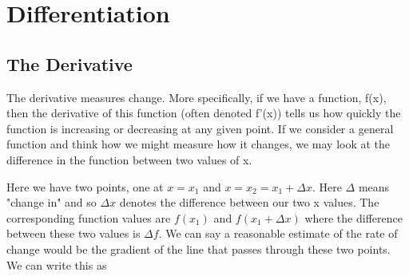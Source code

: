 \chapter{Differentiation}
\section{The Derivative}

The derivative measures change. More specifically, if we have a function, f(x), then the derivative
of this function (often denoted f'(x)) tells us how quickly the function is increasing or decreasing
at any given point. If we consider a general function and think how we might measure how it changes,
we may look at the difference in the function between two values of x.

\begin{center}
\end{center}

Here we have two points, one at $x = x_1$ and $x = x_2 = x_1 + \Delta x$. Here $\Delta$ means "change in"
and so $\Delta x$ denotes the difference between our two x values. The corresponding function values are
$f(x_1)$ and $f(x_1 + \Delta x)$ where the difference between these two values is $\Delta f$. We can say 
a reasonable estimate of the rate of change would be the gradient of the line that passes through these two 
points. We can write this as

